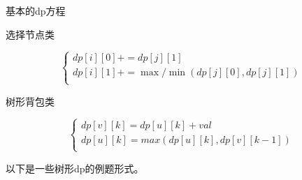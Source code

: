 基本的dp方程

选择节点类

$$
\begin{cases} dp[i][0]+=dp[j][1] \\ dp[i][1]+=\max/\min(dp[j][0],dp[j][1])\\ \end{cases}
$$

树形背包类

$$
\begin{cases} dp[v][k]=dp[u][k]+val\\ dp[u][k]=max(dp[u][k],dp[v][k-1])\\ \end{cases}
$$

以下是一些树形dp的例题形式。
